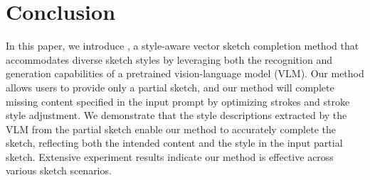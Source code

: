 \section{Conclusion}
In this paper, we introduce \methodName, a style-aware vector sketch completion method that accommodates diverse sketch styles by leveraging both the recognition and generation capabilities of a pretrained  vision-language model (VLM).
Our method allows users to provide only a partial sketch,  and our method will complete missing content specified in the input prompt by optimizing strokes and stroke style adjustment.
We demonstrate that the style descriptions extracted by the VLM from the partial sketch enable our method to accurately complete the sketch, reflecting both the intended content and the style in the input partial sketch.
Extensive experiment results indicate our method is effective across various sketch scenarios. 
